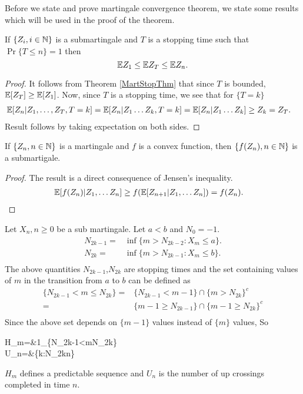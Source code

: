 \documentclass[a4paper,10pt,english]{article}
\begin{document}
Before we state and prove martingale convergence theorem, we state some results which will be used in the proof of the theorem.
\begin{lem}
\label{StoppingTimeBound}
If $\{Z_i, i \in \mathbb{N} \}$ is  a submartingale and $T$ is a stopping time such that $\Pr\{T \leq n\}=1$ then
\begin{equation*}
 \mathbb{E} Z_1 \leq \mathbb{E} Z_T \leq \mathbb{E} Z_n.
\end{equation*}
\end{lem}
\begin{proof}
It follows from Theorem \ref{MartStopThm} that since $T$ is bounded, $\mathbb{E}[Z_T] \geq \mathbb{E}[Z_1]$. Now, since $T$ is a stopping time, we see that for $\{T = k\}$
\begin{eqnarray*}
\mathbb{E}[Z_n|Z_1, \hdots ,Z_T,T=k]&=\mathbb{E}[Z_n|Z_1 \hdots Z_k,T=k] = \mathbb{E}[Z_n|Z_1 \hdots Z_k] \geq Z_k = Z_T.
\end{eqnarray*}
Result follows by taking expectation on both sides.
\end{proof}
\begin{lem}
\label{ConvexFuncSubmart}
If $\{Z_n,n \in \mathbb{N}\}$ is a martingale and $f$ is a convex function, then $\{f(Z_n),n \in \mathbb{N}\}$ is a submartigale.
\end{lem}
\begin{proof}
The result is a direct consequence of Jensen's inequality.
\begin{align*}
\mathbb{E}[f(Z_n)|Z_1, \hdots Z_n] &\geq f(\mathbb{E}[Z_{n+1}|Z_1, \hdots Z_n])=f(Z_n).
\end{align*}
\end{proof}
\begin{con}
	Let ${X_n,n\geq0}$ be a sub martingale. Let $a< b$ and $N_0  = -1$.
	   \begin{eqnarray*}
		N_{2k-1}=&\inf\{m>N_{2k-2}:X_m\leq a \}.\\
		N_{2k}=&\inf\{m>N_{2k-1}:X_m\leq b \}.\\
		\end{eqnarray*}
		The above quantities $N_{2k-1}$,$N_{2k}$ are stopping times and the set containing values of $m$ in the transition from $a$ to $b$ can be defined as
		\begin{eqnarray*}
		\{N_{2k-1}<m\leq N_{2k} \}=&\{N_{2k-1}<m-1\} \cap \{m>N_{2k}\}^{c}\\
		=&\{m-1\geq N_{2k-1}\}\cap\{m-1\geq N_{2k}\}^{c}\\		
		\end{eqnarray*}
		Since the above set depends on $\{m-1\}$ values instead of $\{m\}$ values, So
		\begin{flalign*}
			H_m=&1_{\{N_{2k-1}<m\leq  N_{2k}\}}\\
			U_n=&\sup\{k:N_{2k}\leq n\}
		\end{flalign*}
		 $H_m$ defines a predictable sequence and $U_n$ is the number of up crossings completed in time $n$.
\end{con}
\end{document}
